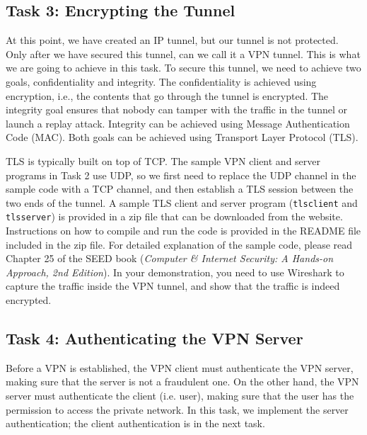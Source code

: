 \subsection{Task 3: Encrypting the Tunnel}


At this point, we have created an IP tunnel, but our tunnel is not protected. 
Only after we have secured this tunnel, can we call it a VPN tunnel. 
This is what we are going to achieve in this task. 
To secure this tunnel, we need to achieve two 
goals, confidentiality and integrity. 
The confidentiality is achieved using encryption, i.e.,
the contents that go through the tunnel is encrypted. 
The integrity goal ensures that nobody can tamper with 
the traffic in the tunnel or launch a replay attack. 
Integrity can be achieved using 
Message Authentication Code (MAC). 
Both goals can be achieved using Transport Layer Protocol (TLS). 


TLS is typically built on top of TCP. The sample VPN client and server 
programs in Task 2 use UDP, so we first need to 
replace the UDP channel in the sample code with a TCP channel, and then establish a
TLS session between the two ends of the tunnel.  A sample TLS client
and server program (\texttt{tlsclient} and \texttt{tlsserver})   
is provided in a zip file that can be downloaded from the website. 
Instructions on how to compile and run the code
is provided in the README file included in the zip file. 
For detailed explanation of the sample
code, please read Chapter 25 of the SEED book (\textit{Computer \& Internet Security: A
Hands-on Approach, 2nd Edition}). In your demonstration, you need to use Wireshark to
capture the traffic inside the VPN tunnel, and show that the traffic is
indeed encrypted. 



\subsection{Task 4: Authenticating the VPN Server}


Before a VPN is established, the VPN client must authenticate
the VPN server, making sure that the server is not a fraudulent 
one. On the other hand, the VPN server must authenticate the
client (i.e. user), making sure that the user has 
the permission to access the private network. 
In this task, we implement the server authentication; 
the client authentication is in the next task. 

